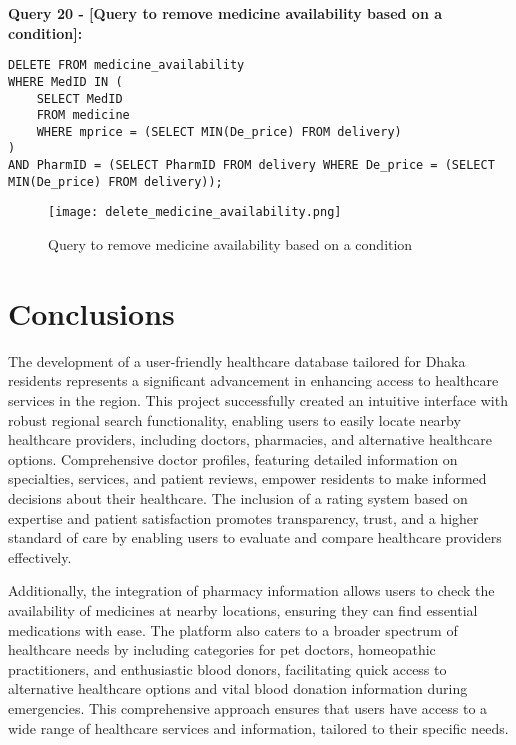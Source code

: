 \documentclass[11pt]{article}
\begin{document}
\textbf{Query 20 - [Query to remove medicine availability based on a condition]:}
\begin{lstlisting}
DELETE FROM medicine_availability 
WHERE MedID IN (
    SELECT MedID
    FROM medicine
    WHERE mprice = (SELECT MIN(De_price) FROM delivery)
)
AND PharmID = (SELECT PharmID FROM delivery WHERE De_price = (SELECT MIN(De_price) FROM delivery));
\end{lstlisting}
\begin{figure}[H]
    \centering
    \texttt{[image: delete\_medicine\_availability.png]}
    \caption{Query to remove medicine availability based on a condition}
    \label{fig:1}
\end{figure}

\section{Conclusions}
The development of a user-friendly healthcare database tailored for Dhaka residents represents a significant advancement in enhancing access to healthcare services in the region. This project successfully created an intuitive interface with robust regional search functionality, enabling users to easily locate nearby healthcare providers, including doctors, pharmacies, and alternative healthcare options. Comprehensive doctor profiles, featuring detailed information on specialties, services, and patient reviews, empower residents to make informed decisions about their healthcare. The inclusion of a rating system based on expertise and patient satisfaction promotes transparency, trust, and a higher standard of care by enabling users to evaluate and compare healthcare providers effectively.

Additionally, the integration of pharmacy information allows users to check the availability of medicines at nearby locations, ensuring they can find essential medications with ease. The platform also caters to a broader spectrum of healthcare needs by including categories for pet doctors, homeopathic practitioners, and enthusiastic blood donors, facilitating quick access to alternative healthcare options and vital blood donation information during emergencies. This comprehensive approach ensures that users have access to a wide range of healthcare services and information, tailored to their specific needs.
\end{document}

